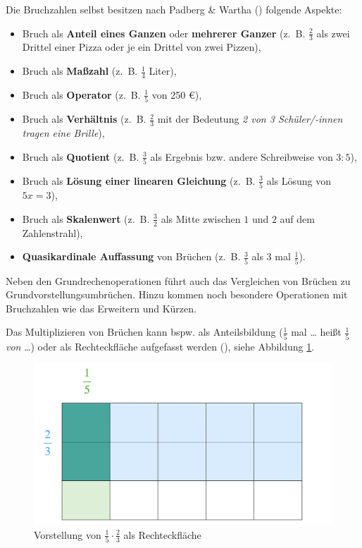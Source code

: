 \documentclass[
]{scrbook}
\providecommand{\tightlist}{%
  \setlength{\itemsep}{0pt}\setlength{\parskip}{0pt}}
\theoremstyle{definition}
\theoremstyle{definition}
\theoremstyle{definition}
\theoremstyle{definition}
\theoremstyle{remark}
\begin{document}
Die Bruchzahlen selbst besitzen nach Padberg \& Wartha () folgende Aspekte:

\begin{itemize}
\tightlist
\item
  Bruch als \textbf{Anteil eines Ganzen} oder \textbf{mehrerer Ganzer}
  (z.~B. \(\frac{2}{3}\) als zwei Drittel einer Pizza oder je ein Drittel von zwei Pizzen),
\item
  Bruch als \textbf{Maßzahl}
  (z.~B. \(\frac{1}{4}\) Liter),
\item
  Bruch als \textbf{Operator}
  (z.~B. \(\frac{1}{5}\) von 250 €),
\item
  Bruch als \textbf{Verhältnis}
  (z.~B. \(\frac{2}{3}\) mit der Bedeutung \emph{2 von 3 Schüler/-innen tragen eine Brille}),
\item
  Bruch als \textbf{Quotient}
  (z.~B. \(\frac{3}{5}\) als Ergebnis bzw. andere Schreibweise von \(3:5\)),
\item
  Bruch als \textbf{Lösung einer linearen Gleichung}
  (z.~B. \(\frac{3}{5}\) als Lösung von \(5x = 3\)),
\item
  Bruch als \textbf{Skalenwert}
  (z.~B. \(\frac{3}{2}\) als Mitte zwischen \(1\) und \(2\) auf dem Zahlenstrahl),
\item
  \textbf{Quasikardinale Auffassung} von Brüchen
  (z.~B. \(\frac{3}{5}\) als 3 mal \(\frac{1}{5}\)).
\end{itemize}

Neben den Grundrechenoperationen führt auch das Vergleichen von Brüchen zu Grundvorstellungsumbrüchen. Hinzu kommen noch besondere Operationen mit Bruchzahlen wie das Erweitern und Kürzen.

Das Multiplizieren von Brüchen kann bspw. als Anteilsbildung (\(\frac{1}{5}\) mal \ldots{} heißt \(\frac{1}{5}\) \emph{von} \ldots) oder als Rechteckfläche aufgefasst werden (), siehe Abbildung \ref{fig:Bruchmultiplikation}.

\begin{figure}

{\centering \includegraphics[width=0.5\linewidth]{pictures/4-Bruchmulti} 

}

\caption{Vorstellung von $\frac{1}{5} \cdot \frac{2}{3}$ als Rechteckfläche}\label{fig:Bruchmultiplikation}
\end{figure}
\end{document}
